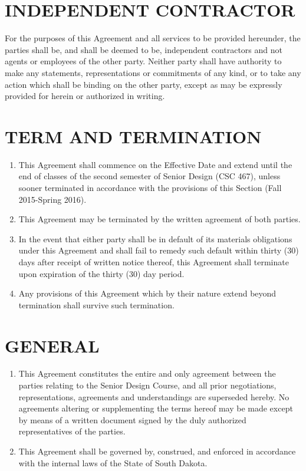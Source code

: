\documentclass[11pt]{article}
\begin{document}
\section{INDEPENDENT CONTRACTOR}  

For the purposes of this Agreement and all services to be provided hereunder, the parties shall be, and shall be deemed to be, independent contractors and not agents or employees of the other party. Neither party shall have authority to make any statements, representations or commitments of any kind, or to take any action which shall be binding on the other party, except as may be expressly provided for herein or authorized in writing.  

\section{TERM AND TERMINATION }    
\begin{enumerate}  \itemsep4pt \parskip0pt 
\item This Agreement shall commence on the Effective Date and extend until the end of classes of the second semester of Senior Design (CSC 467), unless sooner terminated in accordance with the provisions of this Section (Fall 2015-Spring 2016). 

\item This Agreement may be terminated by the written agreement of both       parties.    

\item In the event that either party shall be in default of its       materials obligations under this Agreement and shall fail to       remedy such default within thirty (30) days after receipt of       written notice thereof, this Agreement shall terminate upon       expiration of the thirty (30) day period.    

\item Any provisions of this Agreement which by their nature extend       beyond termination shall survive such termination.  
\end{enumerate}

\section{GENERAL }    
\begin{enumerate}  \itemsep4pt \parskip0pt 
\item This Agreement constitutes the entire and only agreement between       the parties relating to the Senior Design Course, and all prior       negotiations, representations, agreements and understandings are       superseded hereby. No agreements altering or supplementing the       terms hereof may be made except by means of a written document       signed by the duly authorized representatives of the parties.    

\item This Agreement shall be governed by, construed, and enforced in       accordance with the internal laws of the State of South Dakota. 
\end{enumerate}
\end{document}
